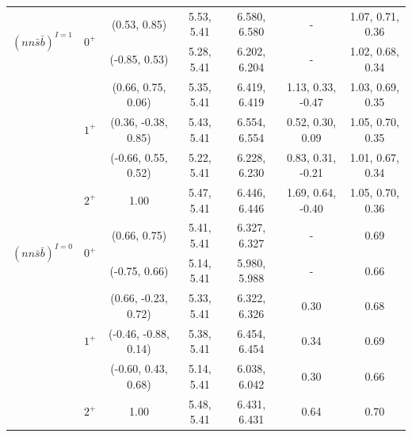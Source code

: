 \documentclass[prt,twocolumn,floatfix,nofootinbib]{revtex4}
\begin{document}
\begin{table}[!htbp]
\begin{tabular}{ccccccc}
        \multirow{2}{*}{${(nn\bar{s}\bar{b})}^{I=1}$}
                        &\multirow{2}{*}{$0^{+}$}
                                    &(0.53, 0.85)           &5.53, 5.41	    &6.580, 6.580	    &-                      &1.07, 0.71, 0.36 \\
                        &           &(-0.85, 0.53)          &5.28, 5.41	    &6.202, 6.204	    &-                      &1.02, 0.68, 0.34 \\
                        &\multirow{3}{*}{$1^{+}$}
                                    &(0.66, 0.75, 0.06)     &5.35, 5.41	    &6.419, 6.419	    &1.13, 0.33, -0.47      &1.03, 0.69, 0.35 \\
                        &           &(0.36, -0.38, 0.85)    &5.43, 5.41	    &6.554, 6.554	    &0.52, 0.30, 0.09       &1.05, 0.70, 0.35 \\
                        &           &(-0.66, 0.55, 0.52)    &5.22, 5.41	    &6.228, 6.230	    &0.83, 0.31, -0.21      &1.01, 0.67, 0.34 \\
                        &$2^{+}$    &1.00                   &5.47, 5.41	    &6.446, 6.446	    &1.69, 0.64, -0.40      &1.05, 0.70, 0.36 \\
        \multirow{2}{*}{${(nn\bar{s}\bar{b})}^{I=0}$}
                        &\multirow{2}{*}{$0^{+}$}
                                    &(0.66, 0.75)           &5.41, 5.41	    &6.327, 6.327	    &-                      &0.69 \\
                        &           &(-0.75, 0.66)          &5.14, 5.41	    &5.980, 5.988	    &-                      &0.66 \\
                        &\multirow{3}{*}{$1^{+}$}
                                    &(0.66, -0.23, 0.72)    &5.33, 5.41	    &6.322, 6.326	    &0.30                   &0.68 \\
                        &           &(-0.46, -0.88, 0.14)   &5.38, 5.41	    &6.454, 6.454	    &0.34                   &0.69 \\
                        &           &(-0.60, 0.43, 0.68)    &5.14, 5.41	    &6.038, 6.042	    &0.30                   &0.66 \\
                        &$2^{+}$    &1.00                   &5.48, 5.41	    &6.431, 6.431	    &0.64                   &0.70 \\
        \hline\hline
    \end{tabular}
\end{table}
\end{document}
